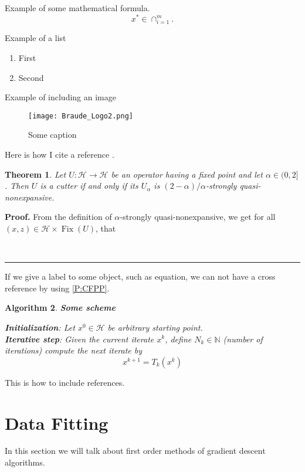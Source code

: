 \documentclass[12pt]{article}
\newtheorem{theorem}{Theorem}
\newtheorem{algorithm}[theorem]{Algorithm}
\newenvironment{proof}[1][Proof]{\textbf{#1.} }{\ \rule{0.5em}{0.5em}}
\begin{document}
Example of some mathematical formula.
\begin{equation}\label{P:CFPP}
x^{\ast }\in \cap _{i=1}^{m}.
\end{equation}

Example of a list

\begin{enumerate}
  \item First
  \item Second
\end{enumerate}

Example of including an image
\begin{figure}[H]
\centering
\texttt{[image: Braude\_Logo2.png]}
\caption{Some caption}
\label{fig:Hyper-plane}
\end{figure}

Here is how I cite a reference \cite{BC11}.

\begin{theorem}\label{th:cuttersAndQNE} Let $U:\mathcal{H}\rightarrow\mathcal{H}$
be an operator having a fixed point and let $\alpha\in(0,2]$. Then $U$ is a
cutter if and only if its $U_\alpha$ is $(2-\alpha)/\alpha$-strongly quasi-nonexpansive.
\end{theorem}

\begin{proof}
From the definition of $\alpha$-strongly quasi-nonexpansive, we get for all $(x,z)\in\mathcal{H}\times\operatorname{Fix}(U)$, that

\end{proof}


If we give a label to some object, such as equation, we can not have a cross reference by using \eqref{P:CFPP}.

\begin{algorithm}\label{alg:Online_Block}$\left. {}\right. $\textbf{Some scheme}

\textbf{Initialization}: Let $x^{0}\in\mathcal{H}$ be arbitrary starting point.\\

\textbf{Iterative step}: Given the current iterate $x^{k}$, define $N_k\in\mathbb{N}$ (number of iterations) compute the next iterate by
\begin{equation}
x^{k+1}=T_k(x^{k})
\end{equation}
\end{algorithm}


This is how to include references.
\section{Data Fitting}
In this section we will talk about first order methods of gradient descent algorithms. \\
\end{document}
